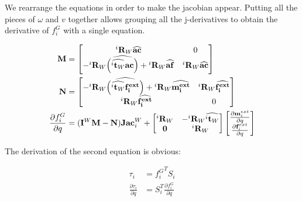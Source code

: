 We rearrange the equations in order to make the jacobian appear.
Putting all the pieces of $\omega$ and $v$ together allows grouping all the j-derivatives to obtain the derivative of $f^G_i$ with a single equation.

\begin{align}
  \bf M &=
  \begin{bmatrix}
    {}^i\mathbf{R}_W \widehat{\bf ac}  & 0\\
    -{{}^i\mathbf{R}_W}\widehat{\left(\widehat{{}^i\mathbf{t}_W}\bf ac \right)}
    + {}^i\mathbf{R}_W \widehat{\bf af}  & {{}^i\mathbf{R}_W}\widehat{\bf ac} \\
  \end{bmatrix}
  \\
  \bf N &=
  \begin{bmatrix}
    - {{}^i\mathbf{R}_W}\widehat{\left(\widehat{{}^i\mathbf{t}_W}\bf \mathbf{f}^{ext}_i \right)} + {}^i\mathbf{R}_W \widehat{\bf \mathbf{m}^{ext}_i} & {{}^i\mathbf{R}_W}\widehat{\bf \mathbf{f}^{ext}_i} \\
    {}^i\mathbf{R}_W \widehat{\bf \mathbf{f}^{ext}_i} & 0\\
  \end{bmatrix}
  \\
  \frac{\partial f^G_i}{\partial q} &= (\mathbf{I}^W \mathbf{M} - \mathbf{N})\mathbf{Jac}^W_i
  +
  \begin{bmatrix}
    {{}^i\mathbf{R}_W} & -{{}^i\mathbf{R}_W}\widehat{{}^i\mathbf{t}_W} \\
    \mathbf{0} & {{}^i\mathbf{R}_W} \\
  \end{bmatrix}
  \begin{bmatrix}
    \frac{\partial \mathbf{m}^{ext}_i}{\partial q} \\ \frac{\partial \mathbf{f}^{ext}_i}{\partial q}
  \end{bmatrix}
\end{align}

The derivation of the second equation is obvious:

\begin{align}
  \tau_i &= {f^G_i}^T S_i \\
  \frac{\partial \tau_i}{\partial q} &= S_i^T \frac{\partial f^G_i}{\partial q} \\
\end{align}

